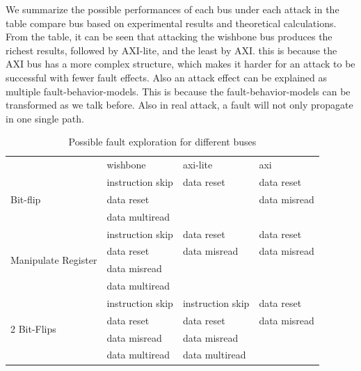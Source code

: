 We summarize the possible performances of each bus under each attack in the table {compare bus} based on experimental results and theoretical calculations. From the table, it can be seen that attacking the wishbone bus produces the richest results, followed by AXI-lite, and the least by AXI. this is because the AXI bus has a more complex structure, which makes it harder for an attack to be successful with fewer fault effects. Also an attack effect can be explained as multiple fault-behavior-models. This is because the fault-behavior-models can be transformed as we talk before. Also in real attack, a fault will not only propagate in one single path. 

\begin{table}[]
\caption{Possible fault exploration for different buses}
\label{compare bus}
\begin{tabular}{llll}
\toprule
                                          & wishbone         & axi-lite         & axi          \\
\multirow{3}{*}{Bit-flip}                 & instruction skip & data reset       & data reset   \\
                                          & data reset       &                  & data misread \\
                                          & data multiread   &                  &              \\
\midrule                                          
\multirow{4}{*}{Manipulate Register}      & instruction skip & data reset       & data reset   \\
                                          & data reset       & data misread     & data misread \\
                                          & data misread     &                  &              \\
                                          & data multiread   &                  &              \\
\midrule                                          
\multirow{4}{*}{2 Bit-Flips}              & instruction skip & instruction skip & data reset   \\
                                          & data reset       & data reset       & data misread \\
                                          & data misread     & data misread     &              \\
                                          & data multiread   & data multiread   &              \\

\end{tabular}
\end{table}
